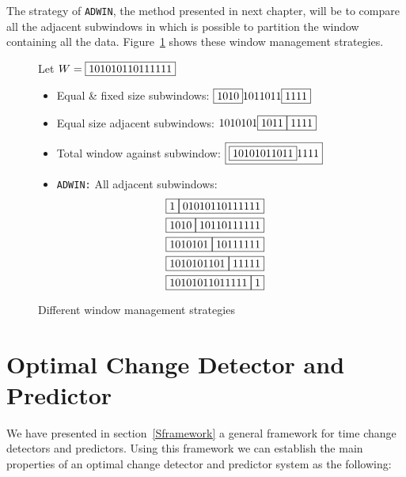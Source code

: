 The strategy of {\tt ADWIN}, the method presented in next chapter, 
will be to compare all the adjacent subwindows in which is possible to partition the window containing all the data.
Figure~\ref{Fig:wms} shows these window management strategies.


\begin{figure}[h]
Let $W= \fbox{101010110111111}$
\begin{itemize}
\item {Equal \& fixed size subwindows:} $ \fbox{1010}1011011\fbox{1111}$

\item {Equal size adjacent subwindows:} $ 1010101\fbox{1011}\fbox{1111}$ 

\item { Total window against subwindow:}
$ \fbox{\fbox{10101011011}1111}$


\item {{\tt ADWIN:}  All adjacent subwindows:}
\begin{eqnarray*}
\fbox{1} \fbox{01010110111111} \\
\fbox{1010} \fbox{10110111111} \\
\fbox{1010101} \fbox{10111111} \\
\fbox{1010101101} \fbox{11111} \\
\fbox{10101011011111} \fbox{1} \\
\end{eqnarray*}

\end{itemize}
\caption{Different window management strategies}
\label{Fig:wms}
\end{figure}

\section{Optimal Change Detector and Predictor}
\label{sOptimal}

We have presented in section~\ref{Sframework} a general framework for 
time change detectors and predictors. Using this framework we can establish
 the main properties of an optimal
change detector and predictor system as the following:

